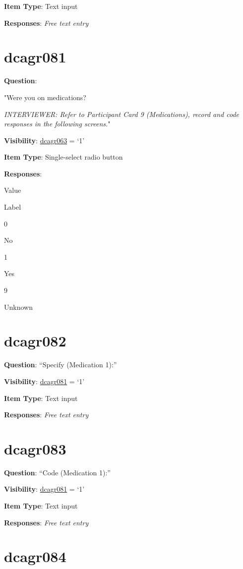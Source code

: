 \documentclass[]{book}
\begin{document}
\textbf{Item Type}: Text input

\textbf{Responses}: \emph{Free text entry}

\hypertarget{dcagr081}{%
\section{dcagr081}\label{dcagr081}}

\textbf{Question}:

"Were you on medications?

\emph{INTERVIEWER: Refer to Participant Card 9 (Medications), record and code responses in the following screens.}"

\textbf{Visibility}: \protect\hyperlink{dcagr063}{dcagr063} = `1'

\textbf{Item Type}: Single-select radio button

\textbf{Responses}:

Value

Label

0

No

1

Yes

9

Unknown

\hypertarget{dcagr082}{%
\section{dcagr082}\label{dcagr082}}

\textbf{Question}: ``Specify (Medication 1):''

\textbf{Visibility}: \protect\hyperlink{dcagr081}{dcagr081} = `1'

\textbf{Item Type}: Text input

\textbf{Responses}: \emph{Free text entry}

\hypertarget{dcagr083}{%
\section{dcagr083}\label{dcagr083}}

\textbf{Question}: ``Code (Medication 1):''

\textbf{Visibility}: \protect\hyperlink{dcagr081}{dcagr081} = `1'

\textbf{Item Type}: Text input

\textbf{Responses}: \emph{Free text entry}

\hypertarget{dcagr084}{%
\section{dcagr084}\label{dcagr084}}
\end{document}
